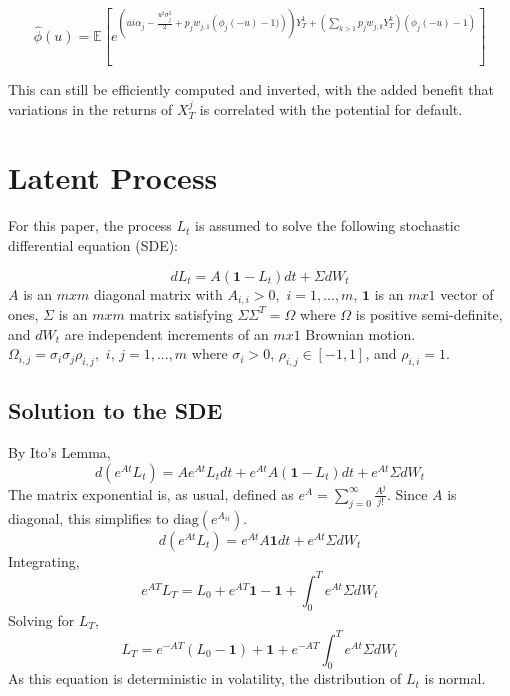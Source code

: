 \documentclass[12pt]{article}
\theoremstyle{definition}
\begin{document}
\begin{equation}
\hat{\phi}(u)=\mathbb{E}\left[e^{\left(ui \alpha_j -\frac{u^2 \sigma_j ^2}{2} +p_j w_{j, 1}\left( \phi_j(-u)-1)\right) \right) Y_T ^ 1 +\left( \sum_{k>1} p_j w_{j, k} Y_T ^ k \right) (\phi_j (-u)-1)} \right]
\end{equation}

This can still be efficiently computed and inverted, with the added benefit that variations in the returns of \(X_T ^ j\) is correlated with the potential for default.  

\section{Latent Process}
For this paper, the process \(L_t\) is assumed to solve the following stochastic differential equation (SDE):

\[dL_t={A} (\mathbf{1}-{L_t}) dt +{\Sigma}d {W_t}\] 
 \({A}\) is an \(m x m\) diagonal matrix with \({A}_{i, i}>0, \,\, i = 1, ..., m\), \(\mathbf{1}\) is an \(m x 1\) vector of ones, \({\Sigma}\) is an \(m x m\) matrix satisfying \({\Sigma}{\Sigma}^T={\Omega}\) where \({\Omega}\) is positive semi-definite, and \(d{W_t}\) are independent increments of an \(m x 1\) Brownian motion.  \({\Omega}_{i, j}=\sigma_i \sigma_j \rho_{i, j},\,\,  i,\,j = 1, ...,m\) where \(\sigma_i>0\), \(\rho_{i, j} \in [-1, 1]\), and \(\rho_{i, i}=1\).

\subsection{Solution to the SDE}

By Ito's Lemma, 
\begin{equation} d\left(e^{{A}t}{L_t}\right)={A}e^{{A}t}{L_t}dt+e^{{A}t}{A} (\mathbf{1}-{L_t}) dt +e^{{A}t}{\Sigma}d {W_t} \end{equation}
The matrix exponential is, as usual, defined as \(e^{{A}}=\sum_{j=0} ^ \infty \frac{{A}^j }{j!}\).  Since \({A}\) is diagonal, this simplifies to \(\text{diag}\left(e^{A_{ii}}\right)\).
\begin{equation} d\left(e^{{A}t}{L_t}\right)=e^{{A}t}{A} \mathbf{1} dt +e^{{A}t}{\Sigma}d {W_t} \end{equation}
Integrating,
\begin{equation} e^{{A}T}{L_T}=L_0+e^{AT} \mathbf{1}-\mathbf{1}+\int_0 ^ T e^{{A}t} {\Sigma}d {W_t} \end{equation}
Solving for \(L_T\),
\begin{equation} \label{solutionL} {L_T}=e^{-AT}(L_0-\mathbf{1})+ \mathbf{1}+e^{-AT}\int_0 ^ T e^{{A}t} {\Sigma}d {W_t} \end{equation}
As this equation is deterministic in volatility, the distribution of \(L_t\) is normal.  
\end{document}
